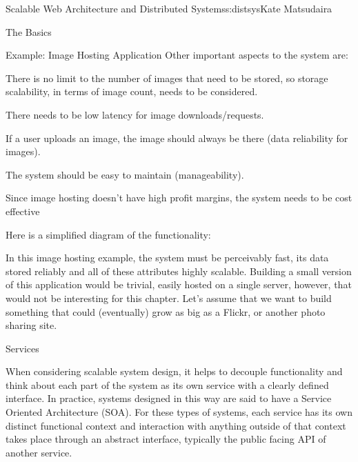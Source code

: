 \begin{aosachapter}{Scalable Web Architecture and Distributed Systems}{s:distsys}{Kate Matsudaira}
\begin{aosasect1}{The Basics}
\begin{aosasect2}{Example: Image Hosting Application}
Other important aspects to the system are:

\begin{aosaitemize}

\item There is no limit to the number of images that need to be
  stored, so storage scalability, in terms of image count, needs to be
  considered.

\item There needs to be low latency for image downloads/requests.

\item If a user uploads an image, the image should always be there
  (data reliability for images).

\item The system should be easy to maintain (manageability).

\item Since image hosting doesn’t have high profit margins, the system
  needs to be cost effective

\end{aosaitemize}

Here is a simplified diagram of the functionality:


In this image hosting example, the system must be perceivably fast,
its data stored reliably and all of these attributes highly
scalable. Building a small version of this application would be
trivial, easily hosted on a single server, however, that would not be
interesting for this chapter. Let’s assume that we want to build
something that could (eventually) grow as big as a Flickr, or another
photo sharing site.

\end{aosasect2}

\begin{aosasect2}{Services}

When considering scalable system design, it helps to decouple
functionality and think about each part of the system as its own
service with a clearly defined interface. In practice, systems
designed in this way are said to have a Service Oriented Architecture
(SOA). For these types of systems, each service has its own distinct
functional context and interaction with anything outside of that
context takes place through an abstract interface, typically the
public facing API of another service.


\end{aosasect2}
\end{aosasect1}
\end{aosachapter}
